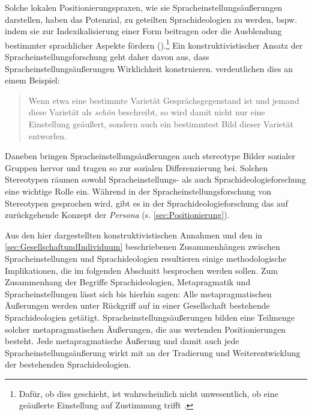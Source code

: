 Solche lokalen Positionierungspraxen, wie sie Spracheinstellungsäußerungen darstellen, haben das Potenzial, zu geteilten Sprachideologien zu werden, bspw. indem sie zur Indexikalisierung einer Form beitragen oder die Ausblendung bestimmter sprachlicher Aspekte fördern (\cites[s.][211]{Tophinke.2006}[59]{Cuonz.2014}[8]{Spitzmuller.2017b}).\footnote{Dafür, ob dies geschieht, ist wahrscheinlich nicht unwesentlich, ob eine geäußerte Einstellung auf Zustimmung trifft \citep[s.][211]{Tophinke.2006}.}
Ein konstruktivistischer Ansatz der Spracheinstellungsforschung geht daher davon aus, dass Spracheinstellungsäu{\ss}erungen Wirklichkeit konstruieren. 
\citet[]{Tophinke.2006} verdeutlichen dies an einem Beispiel: 
\begin{quote} Wenn etwa eine bestimmte Varietät Gesprächsgegenstand ist und jemand diese Varietät als \textit{schön} beschreibt, so wird damit nicht nur eine Einstellung geäußert, sondern auch ein bestimmtest Bild dieser Varietät entworfen. \citep[209--210]{Tophinke.2006}\end{quote}
Daneben bringen Spracheinstellungsäußerungen auch stereotype Bilder sozialer Gruppen hervor und tragen so zur sozialen Differenzierung bei. 
Solchen Stereotypen räumen sowohl Spracheinstellungs- als auch Sprachideologieforschung eine wichtige Rolle ein. 
Während in der Spracheinstellungsforschung von Stereotypen gesprochen wird, gibt es in der Sprachideologieforschung das auf \citet{Bachtin.1990} zurückgehende Konzept der \textit{Persona} (s. \autoref{sec:Positionierung}).

Aus den hier dargestellten konstruktivistischen Annahmen und den in \autoref{sec:GesellschaftundIndividuum} beschriebenen Zusammenhängen zwischen Spracheinstellungen und Sprachideologien resultieren einige methodologische Implikationen, die im folgenden Abschnitt besprochen werden sollen. 
Zum Zusammenhang der Begriffe Sprachideologien, Metapragmatik und Spracheinstellungen lässt sich bis hierhin sagen: Alle metapragmatischen Äußerungen werden unter Rückgriff auf in einer Gesellschaft bestehende Sprachideologien getätigt. 
Spracheinstellungsäußerungen bilden eine Teilmenge solcher metapragmatischen Äußerungen, die aus wertenden Positionierungen besteht. 
Jede metapragmatische Äußerung und damit auch jede Spracheinstellungsäußerung wirkt mit an der Tradierung und Weiterentwicklung der bestehenden Sprachideologien.
